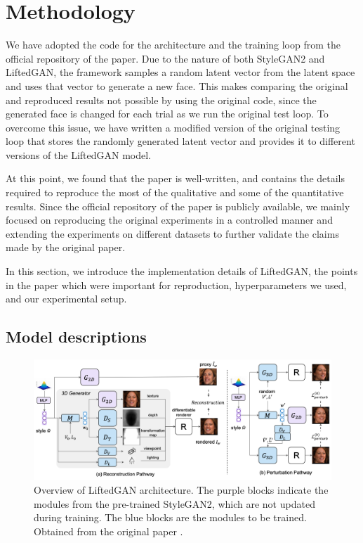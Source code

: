 \section{Methodology}
We have adopted the code for the architecture and the training loop from the official repository of the paper. Due to the nature of both StyleGAN2 and LiftedGAN, the framework samples a random latent vector from the latent space and uses that vector to generate a new face. This makes comparing the original and reproduced results not possible by using the original code, since the generated face is changed for each trial as we run the original test loop. To overcome this issue, we have written a modified version of the original testing loop that stores the randomly generated latent vector and provides it to different versions of the LiftedGAN model.

At this point, we found that the paper is well-written, and contains the details required to reproduce the most of the qualitative and some of the quantitative results. Since the official repository of the paper is publicly available, we mainly focused on reproducing the original experiments in a controlled manner and extending the experiments on different datasets to further validate the claims made by the original paper.

In this section, we introduce the implementation details of LiftedGAN, the points in the paper which were important for reproduction, hyperparameters we used, and our experimental setup.

\subsection{Model descriptions}
\label{model_desc}

\begin{figure}[t]
\centering
\includegraphics[width=1\linewidth]{../openreview/images/LiftedGAN.png}
\caption{Overview of LiftedGAN architecture. The purple blocks indicate the modules from the pre-trained StyleGAN2, which are not updated during training. The blue blocks are the modules to be trained. Obtained from the original paper \cite{shi2021lifting}.}
\label{fig:LiftedGAN}
\end{figure}


